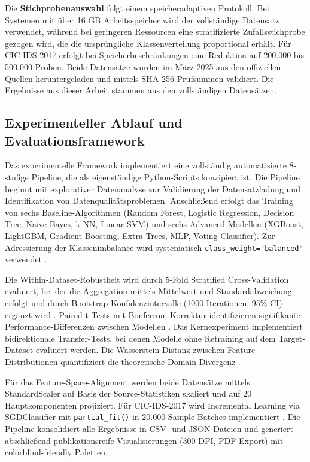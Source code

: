 \documentclass[11pt,a4paper]{article}
\begin{document}
    Die \textbf{Stichprobenauswahl} folgt einem speicheradaptiven Protokoll. Bei Systemen mit über 16 GB Arbeitsspeicher wird der vollständige Datensatz verwendet, während bei geringeren Ressourcen eine stratifizierte Zufallsstichprobe gezogen wird, die die ursprüngliche Klassenverteilung proportional erhält. Für CIC-IDS-2017 erfolgt bei Speicherbeschränkungen eine Reduktion auf 200.000 bis 500.000 Proben. Beide Datensätze wurden im März 2025 aus den offiziellen Quellen heruntergeladen \parencite{NSLKDD2024,CICIDS2017} und mittels SHA-256-Prüfsummen validiert. Die Ergebnisse aus dieser Arbeit stammen aus den vollständigen Datensätzen.

    \subsection{Experimenteller Ablauf und Evaluationsframework}

    Das experimentelle Framework implementiert eine vollständig automatisierte 8-stufige Pipeline, die als eigenständige Python-Scripts konzipiert ist. Die Pipeline beginnt mit explorativer Datenanalyse zur Validierung der Datensatzladung und Identifikation von Datenqualitätsproblemen. Anschließend erfolgt das Training von sechs Baseline-Algorithmen (Random Forest, Logistic Regression, Decision Tree, Naive Bayes, k-NN, Linear SVM) und sechs Advanced-Modellen (XGBoost, LightGBM, Gradient Boosting, Extra Trees, MLP, Voting Classifier). Zur Adressierung der Klassenimbalance wird systematisch \texttt{class\_weight="balanced"} verwendet \parencite{Hastie2009,Vinayakumar2019}.

    Die Within-Dataset-Robustheit wird durch 5-Fold Stratified Cross-Validation evaluiert, bei der die Aggregation mittels Mittelwert und Standardabweichung erfolgt und durch Bootstrap-Konfidenzintervalle (1000 Iterationen, 95\% CI) ergänzt wird \parencite{Hastie2009}. Paired t-Tests mit Bonferroni-Korrektur identifizieren signifikante Performance-Differenzen zwischen Modellen \parencite{Hastie2009}. Das Kernexperiment implementiert bidirektionale Transfer-Tests, bei denen Modelle ohne Retraining auf dem Target-Dataset evaluiert werden. Die Wasserstein-Distanz zwischen Feature-Distributionen quantifiziert die theoretische Domain-Divergenz \parencite{Bishop2006}.

    Für das Feature-Space-Alignment werden beide Datensätze mittels StandardScaler auf Basis der Source-Statistiken skaliert und auf 20 Hauptkomponenten projiziert. Für CIC-IDS-2017 wird Incremental Learning via SGDClassifier mit \texttt{partial\_fit()} in 20.000-Sample-Batches implementiert \parencite{Bishop2006}. Die Pipeline konsolidiert alle Ergebnisse in CSV- und JSON-Dateien und generiert abschließend publikationsreife Visualisierungen (300 DPI, PDF-Export) mit colorblind-friendly Paletten.
\end{document}
